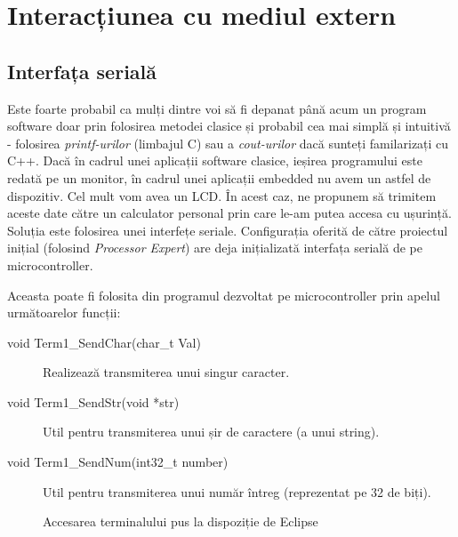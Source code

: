 \chapter{Interacțiunea cu mediul extern}

\section{Interfața serială}

\label{sec:InterfataSeriala}

Este foarte probabil ca mulți dintre voi să fi depanat până acum un program software doar prin folosirea metodei clasice și probabil cea mai simplă și intuitivă - folosirea \textit{printf-urilor} (limbajul C) sau a \textit{cout-urilor} dacă sunteți familarizați cu C++. Dacă în cadrul unei aplicații software clasice, ieșirea programului este redată pe un monitor, în cadrul unei aplicații embedded nu avem un astfel de dispozitiv. Cel mult vom avea un LCD. În acest caz, ne propunem să trimitem aceste date către un calculator personal prin care le-am putea accesa cu ușurință. Soluția este folosirea unei interfețe seriale. Configurația oferită de către proiectul inițial (folosind \textit{Processor Expert}) are deja inițializată interfața serială de pe microcontroller.

Aceasta poate fi folosita din programul dezvoltat pe microcontroller prin apelul următoarelor funcții:

\begin{description}
    \item[void Term1\_SendChar(char\_t Val)] Realizează transmiterea unui singur caracter.
    \item[void Term1\_SendStr(void *str)] Util pentru transmiterea unui șir de caractere (a unui string).
    \item[void Term1\_SendNum(int32\_t number)] Util pentru transmiterea unui număr întreg (reprezentat pe 32 de biți).
\end{description}

\begin{figure}[h!]
  \vspace{-10pt}
  \vspace{-5pt}
  \caption{\label{fig:CodeWarrior-EclipseTerminal} Accesarea terminalului pus la dispoziție de Eclipse}
  \vspace{-10pt}
\end{figure}

